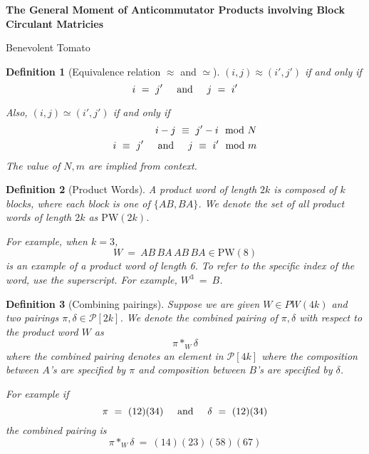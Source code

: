 \documentclass{article}
\newcommand{\textAnd}{
    {
        \hspace{5mm}
        \textrm{and}
        \hspace{5mm}
    }
}
\newcommand{\PW}{\text{PW}}
\newtheorem{definition}{Definition}
\begin{document}
\begin{center}
    \Large
    \textbf{The General Moment of Anticommutator 
    Products involving Block Circulant Matricies}

    \large
    Benevolent Tomato
\end{center}


\begin{definition} [Equivalence relation $\approx$ and $\simeq$]

    $(i, j) \approx (i', j')$ if and only if 
    \begin{equation}
        i \ = \ j' \textAnd j \ = \ i'
    \end{equation}

    Also, 
$(i, j) \simeq (i', j')$ if and only if 
    \begin{eqnarray}
        i - j \ \equiv \ j' - i \mod N 
    \\
       i \ \equiv \ j' \textAnd j \ \equiv \ i' \mod m
    \end{eqnarray}
    The value of $N, m$ are implied from context. 
\end{definition}

\begin{definition}[Product Words]
A \textit{product word} of length \(2k\) is composed of \(k\) blocks, where each block is one of \(\{AB, BA\}\). 
We denote the set of all product words of length $2k$ as 
$\PW(2k)$.


For example, when \(k = 3\),
\[
W \ = \ AB \, BA \, AB \, BA \in \PW(8)
\]
is an example of a product word of length 6. To 
refer to the specific index of the word, use the superscript. 
For example, $W^3 \ =\ B$. 

\end{definition}

\begin{definition}[Combining pairings]
    Suppose we are given $W \in PW(4k)$ and two pairings 
    $\pi, \delta \in \mathcal{P}[2k]$. We denote the 
    combined pairing of $\pi, \delta$ with respect 
    to the product word $W$ as 
    \[
        \pi *_W \delta
    \]
    where the combined pairing denotes an element in $\mathcal{P}[4k]$ 
    where the composition between $A$'s are specified by $\pi$ and 
    composition between $B$'s are specified by $\delta$. 

    For example if 
    \[
    \pi \ = \ (1 2) (3 4) \textAnd 
    \delta \ = \ (12) (34)
    \]
    the combined pairing is 
    \[
    \pi *_W \delta \ = \ (1 4)(2 3)(5 8)(67)
    \]
\end{definition}
    
\end{document}
